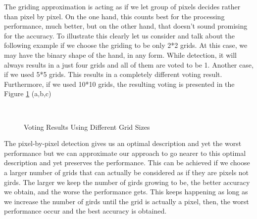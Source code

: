 \documentclass[12pt,fleqn]{book} %
\begin{document}
The griding approximation is acting as if we let group of pixels decides rather than pixel by pixel. On the one hand, this counts best for the processing performance, much better, but on the other hand, that doesn’t sound promising for the accuracy. To illustrate this clearly let us consider and talk about the following example if we choose the griding to be only 2*2 grids. At this case, we may have the binary shape of the hand, in any form. While detection, it will always results in a just four grids and all of them are voted to be 1. Another case, if we used 5*5 grids. This results in a completely different voting result. Furthermore, if we used 10*10 grids, the resulting voting is presented in the Figure \ref{fig:bin_sizes} (a,b,c)
\begin{figure}[h]
\begin{dBox}
\centering
  \mbox{
   }
   \caption{Voting Results Using Different Grid Sizes \label{fig:bin_sizes} }   
\end{dBox}   
\end{figure}

The pixel-by-pixel detection gives us an optimal description and yet the worst performance but we can approximate our approach to go nearer to this optimal description and yet preserves the performance. This can be achieved if we choose a larger number of grids that can actually be considered as if they are pixels not girds. The larger we keep the number of girds growing to be, the better accuracy we obtain, and the worse the performance gets. This keeps happening as long as we increase the number of girds until the grid is actually a pixel, then, the worst performance occur and the best accuracy is obtained.\bigskip
\end{document}

